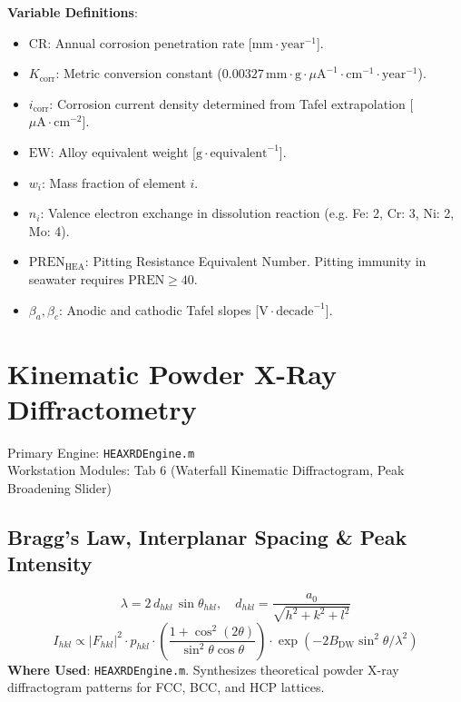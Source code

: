 \documentclass[11pt,a4paper]{article}
\begin{document}
\noindent\textbf{Variable Definitions}:
\begin{itemize}
  \item $\text{CR}$: Annual corrosion penetration rate [$\text{mm}\cdot\text{year}^{-1}$].
  \item $K_{\text{corr}}$: Metric conversion constant ($0.00327 \, \text{mm}\cdot\text{g}\cdot\mu\text{A}^{-1}\cdot\text{cm}^{-1}\cdot\text{year}^{-1}$).
  \item $i_{\text{corr}}$: Corrosion current density determined from Tafel extrapolation [$\mu\text{A}\cdot\text{cm}^{-2}$].
  \item $\text{EW}$: Alloy equivalent weight [$\text{g}\cdot\text{equivalent}^{-1}$].
  \item $w_i$: Mass fraction of element $i$.
  \item $n_i$: Valence electron exchange in dissolution reaction (e.g. Fe: 2, Cr: 3, Ni: 2, Mo: 4).
  \item $\text{PREN}_{\text{HEA}}$: Pitting Resistance Equivalent Number. Pitting immunity in seawater requires $\text{PREN} \ge 40$.
  \item $\beta_a, \beta_c$: Anodic and cathodic Tafel slopes [$\text{V}\cdot\text{decade}^{-1}$].
\end{itemize}

\section{Kinematic Powder X-Ray Diffractometry}
Primary Engine: \texttt{HEAXRDEngine.m} \\
Workstation Modules: Tab 6 (Waterfall Kinematic Diffractogram, Peak Broadening Slider)

\subsection{Bragg's Law, Interplanar Spacing \& Peak Intensity}
\begin{equation}
\lambda = 2 \, d_{hkl} \, \sin\theta_{hkl}, \quad d_{hkl} = \frac{a_0}{\sqrt{h^2 + k^2 + l^2}}
\end{equation}
\begin{equation}
I_{hkl} \propto |F_{hkl}|^2 \cdot p_{hkl} \cdot \left(\frac{1 + \cos^2(2\theta)}{\sin^2\theta \cos\theta}\right) \cdot \exp(-2 B_{\text{DW}} \sin^2\theta / \lambda^2)
\end{equation}
\textbf{Where Used}: \texttt{HEAXRDEngine.m}. Synthesizes theoretical powder X-ray diffractogram patterns for FCC, BCC, and HCP lattices.
\end{document}
